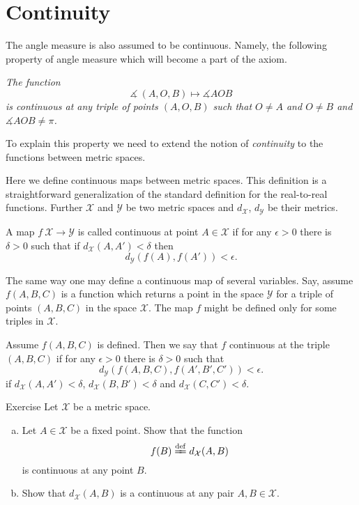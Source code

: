 \section*{Continuity}

The angle measure is also assumed to be continuous.
Namely, the following property of angle measure which will become a part of the axiom.

\textit{The function}
$$\measuredangle\:(A,O,B)\mapsto\measuredangle A O B$$
\textit{is continuous at any triple of points $(A,O,B)$
such that $O\ne A$ and $O\ne B$ and $\measuredangle A O B\ne\pi$.}

To explain this property we need to extend the notion of {}\emph{continuity} to the functions between metric spaces.

Here we define continuous maps between metric spaces.
This definition is a straightforward generalization of the standard definition for the real-to-real functions.
Further $\mathcal X$ and $\mathcal Y$ be two metric spaces 
and $d_{\mathcal X}$, $d_{\mathcal Y}$ be their metrics.

A map $f\:\mathcal X\to\mathcal Y$ is called continuous at point $A\in \mathcal X$
if for any  $\epsilon>0$ there is $\delta>0$ such that if $d_{\mathcal X}(A,A')<\delta$ then
$$d_{\mathcal Y}(f(A),f(A'))<\epsilon.$$

The same way one may define a continuous map of several variables.
Say, assume $f(A,B,C)$ is a function which returns a point in the space $\mathcal Y$ for a triple of points $(A,B,C)$
in the space $\mathcal X$.
The map $f$ might be defined only for some triples in $\mathcal X$.

Assume $f(A,B,C)$ is defined.
Then we say that $f$ continuous at the triple $(A,B,C)$ 
if for any $\epsilon>0$ there is $\delta>0$ such that 
$$d_{\mathcal Y}(f(A,B,C),f(A',B',C'))<\epsilon.$$
if $d_{\mathcal X}(A,A')<\delta$, $d_{\mathcal X}(B,B')<\delta$ and $d_{\mathcal X}(C,C')<\delta$.


\begin{thm}{Exercise}\label{ex:dist-cont}
Let $\mathcal{X}$ be a metric space.
\begin{enumerate}[(a)]
\item\label{ex:dist-cont:a} Let $A\in \mathcal{X}$ be a fixed point.
Show that the function 
$$f(B)\df
d_{\mathcal{X}}(A,B)$$ 
is continuous at any point $B$.
\item Show that $d_{\mathcal{X}}(A,B)$ is a continuous  at any pair $A,B\in \mathcal{X}$.
\end{enumerate}

\end{thm}


